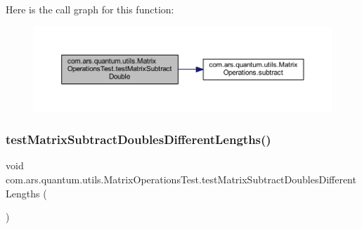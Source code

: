 Here is the call graph for this function\+:\nopagebreak
\begin{figure}[H]
\begin{center}
\leavevmode
\includegraphics[width=350pt]{classcom_1_1ars_1_1quantum_1_1utils_1_1_matrix_operations_test_a531e80f804f35d3f8fd8d35eab4b4faa_cgraph}
\end{center}
\end{figure}
\hypertarget{classcom_1_1ars_1_1quantum_1_1utils_1_1_matrix_operations_test_a5ea063677df577695471228de2a4b6bf}{}\label{classcom_1_1ars_1_1quantum_1_1utils_1_1_matrix_operations_test_a5ea063677df577695471228de2a4b6bf} 
\subsubsection{\texorpdfstring{test\+Matrix\+Subtract\+Doubles\+Different\+Lengths()}{testMatrixSubtractDoublesDifferentLengths()}}
{\footnotesize\ttfamily void com.\+ars.\+quantum.\+utils.\+Matrix\+Operations\+Test.\+test\+Matrix\+Subtract\+Doubles\+Different\+Lengths (\begin{DoxyParamCaption}{ }\end{DoxyParamCaption})}

